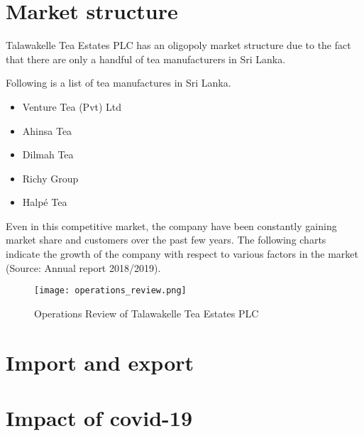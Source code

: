 \documentclass[12pt]{report}
\begin{document}
\chapter{Market structure}
Talawakelle Tea Estates PLC has an oligopoly market structure due to the fact that there are only a handful of tea manufacturers in Sri Lanka.

Following is a list of tea manufactures in Sri Lanka.
\begin{itemize}
	\item {Venture Tea (Pvt) Ltd}
	\item {Ahinsa Tea}
	\item {Dilmah Tea}
	\item {Richy Group}
	\item {Halpé Tea}
\end{itemize}

Even in this competitive market, the company have been constantly gaining market share and customers over the past few years. The following charts indicate the growth of the company with respect to various factors in the market (Source: Annual report 2018/2019).

\begin{figure}[H]
	\centering
	\texttt{[image: operations\_review.png]}
	\caption{Operations Review of Talawakelle Tea Estates PLC}
\end{figure}

\chapter{Import and export}

\chapter{Impact of covid-19}
\end{document}
